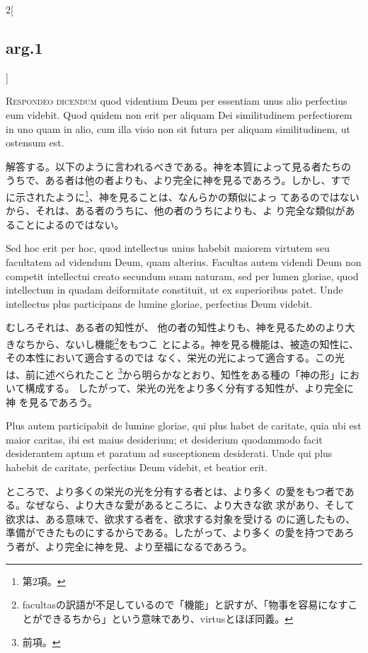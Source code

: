 \documentclass[paper=a4paper,fontsize=10pt,jafontsize=9pt,titlepage]{jlreq}
\begin{document}
\begin{paracol}{2}[\subsection{arg.1}]

{\scshape Respondeo dicendum} quod videntium Deum per essentiam unus alio
perfectius eum videbit. Quod quidem non erit per aliquam Dei
similitudinem perfectiorem in uno quam in alio, cum illa visio non sit
futura per aliquam similitudinem, ut ostensum est.

\switchcolumn

解答する。以下のように言われるべきである。神を本質によって見る者たちの
うちで、ある者は他の者よりも、より完全に神を見るであろう。しかし、すで
に示されたように\footnote{第2項。}、神を見ることは、なんらかの類似によっ
てあるのではないから、それは、ある者のうちに、他の者のうちによりも、よ
り完全な類似があることによるのではない。

\switchcolumn*

Sed hoc erit per
hoc, quod intellectus unius habebit maiorem virtutem seu facultatem ad
videndum Deum, quam alterius. Facultas autem videndi Deum non competit
intellectui creato secundum suam naturam, sed per lumen gloriae, quod
intellectum in quadam deiformitate constituit, ut ex superioribus
patet. Unde intellectus plus participans de lumine gloriae, perfectius
Deum videbit.

\switchcolumn

むしろそれは、ある者の知性が、
他の者の知性よりも、神を見るためのより大きなちから、ないし機能\footnote{facultasの訳語が不足しているので「機能」と訳すが、「物事を容易になすことができるちから」という意味であり、virtusとほぼ同義。}をもつこ
とによる。神を見る機能は、被造の知性に、その本性において適合するのでは
なく、栄光の光によって適合する。この光は、前に述べられたこと
\footnote{前項。}から明らかなとおり、知性をある種の「神の形」において構成する。
したがって、栄光の光をより多く分有する知性が、より完全に神
を見るであろう。

\switchcolumn*

Plus autem participabit de lumine gloriae, qui plus
habet de caritate, quia ubi est maior caritas, ibi est maius
desiderium; et desiderium quodammodo facit desiderantem aptum et
paratum ad susceptionem desiderati. Unde qui plus habebit de caritate,
perfectius Deum videbit, et beatior erit.

\switchcolumn

ところで、より多くの栄光の光を分有する者とは、より多く
の愛をもつ者である。なぜなら、より大きな愛があるところに、より大きな欲
求があり、そして欲求は、ある意味で、欲求する者を、欲求する対象を受ける
のに適したもの、準備ができたものにするからである。したがって、より多く
の愛を持つであろう者が、より完全に神を見、より至福になるであろう。


\end{paracol}
\end{document}
